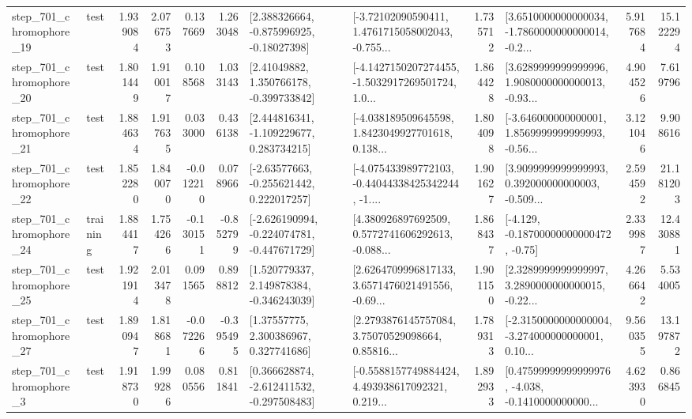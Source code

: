 \begin{tabular}{llrrrrllrlrr}
  step\_701\_chromophore\_19 &      test &      1.939084 &    2.076753 &      0.137669 &  1.263048 &    [2.388326664, -0.875996925, -0.18027398] &  [-3.72102090590411, 1.4761715058002043, -0.755... &       1.735712 &  [3.6510000000000034, -1.7860000000000014, -0.2... &            5.917684 &         15.122294 \\
  step\_701\_chromophore\_20 &      test &      1.801449 &    1.910017 &      0.108568 &  1.033143 &     [2.41049882, 1.350766178, -0.399733842] &  [-4.1427150207274455, -1.5032917269501724, 1.0... &       1.864428 &  [3.6289999999999996, 1.9080000000000013, -0.93... &            4.904526 &          7.619796 \\
  step\_701\_chromophore\_21 &      test &      1.884634 &    1.917635 &      0.033000 &  0.436138 &    [2.444816341, -1.109229677, 0.283734215] &  [-4.038189509645598, 1.8423049927701618, 0.138... &       1.804098 &  [-3.646000000000001, 1.8569999999999993, -0.56... &            3.121046 &          9.908616 \\
  step\_701\_chromophore\_22 &      test &      1.852280 &    1.840070 &     -0.012210 &  0.078966 &    [-2.63577663, -0.255621442, 0.222017257] &  [-4.075433989772103, -0.44044338425342244, -1.... &       1.901627 &  [3.9099999999999993, 0.392000000000003, -0.509... &            2.594592 &         21.181203 \\
  step\_701\_chromophore\_24 &  training &      1.884417 &    1.754266 &     -0.130151 & -0.852799 &  [-2.626190994, -0.224074781, -0.447671729] &  [4.380926897692509, 0.5772741606292613, -0.088... &       1.868437 &              [-4.129, -0.18700000000000472, -0.75] &            2.339987 &         12.430881 \\
  step\_701\_chromophore\_25 &      test &      1.921914 &    2.013478 &      0.091565 &  0.898812 &    [1.520779337, 2.149878384, -0.346243039] &  [2.6264709996817133, 3.6571476021491556, -0.69... &       1.901150 &  [2.3289999999999997, 3.2890000000000015, -0.22... &            4.266642 &          5.534005 \\
  step\_701\_chromophore\_27 &      test &      1.890947 &    1.818681 &     -0.072266 & -0.395495 &      [1.37557775, 2.300386967, 0.327741686] &  [2.2793876145757084, 3.75070529098664, 0.85816... &       1.789313 &  [-2.3150000000000004, -3.274000000000001, 0.10... &            9.560355 &         13.197872 \\
   step\_701\_chromophore\_3 &      test &      1.918730 &    1.999286 &      0.080556 &  0.811841 &   [0.366628874, -2.612411532, -0.297508483] &  [-0.5588157749884424, 4.493938617092321, 0.219... &       1.892933 &  [0.47599999999999976, -4.038, -0.1410000000000... &            4.623930 &          0.866845 \\

\end{tabular}
